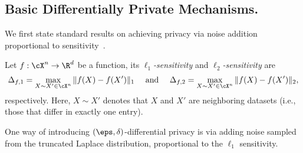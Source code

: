 \subsection{Basic Differentially Private Mechanisms.}
We first state standard results on achieving
privacy via noise addition proportional to
sensitivity~\cite{DworkMNS06}.

\begin{definition}[Sensitivity]
    Let $f : \cX^n \to \R^d$ be a function,
    its \emph{$\ell_1$-sensitivity} and
    \emph{$\ell_2$-sensitivity} are
    $$\Delta_{f,1} = \max_{X \sim X' \in \cX^n} \| f(X) - f(X') \|_1
    ~~~~\textrm{and}~~~~\Delta_{f,2} = \max_{X \sim X' \in \cX^n} \| f(X) - f(X') \|_2,$$
    respectively.
    Here, $X \sim X'$ denotes that $X$ and $X'$
    are neighboring datasets (i.e., those that
    differ in exactly one entry).
\end{definition}




One way of introducing $(\eps,\delta)$-differential
privacy is via adding noise sampled from the truncated
Laplace distribution, proportional to the $\ell_1$
sensitivity.

